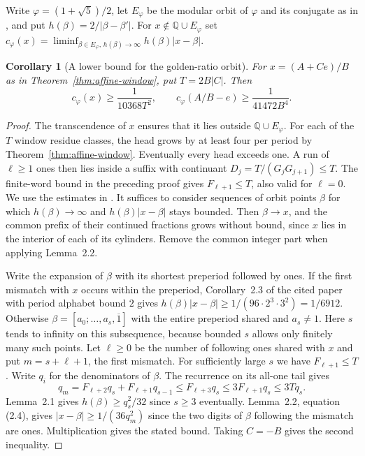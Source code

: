 \documentclass[11pt]{amsart}
\newtheorem{corollary}[theorem]{Corollary}
\theoremstyle{definition}
\theoremstyle{remark}
\numberwithin{equation}{section}
\newcommand{\Q}{\mathbb{Q}}
\begin{document}
Write $\varphi=(1+\sqrt5)/2$, let $E_\varphi$ be the modular orbit
of $\varphi$ and its conjugate as in \cite[(1.1)--(1.2)]{BugeaudQuad},
and put $h(\beta)=2/|\beta-\beta'|$. For $x\notin\Q\cup E_\varphi$
set $c_\varphi(x)=\liminf_{\beta\in E_\varphi,\,h(\beta)\to\infty}
h(\beta)|x-\beta|$.
\begin{corollary}[A lower bound for the golden-ratio orbit]\label{cor:golden-bound}
For $x=(A+Ce)/B$ as in Theorem~\ref{thm:affine-window}, put
$T=2B|C|$. Then
\[
 c_\varphi(x)\ge\frac{1}{10368T^2},
 \qquad c_\varphi(A/B-e)\ge\frac{1}{41472B^4}.
\]
\end{corollary}
\begin{proof}
The transcendence of $x$ ensures that it lies outside $\Q\cup E_\varphi$.
For each of the $T$ window residue classes, the head grows by at least
four per period by Theorem~\ref{thm:affine-window}. Eventually every
head exceeds one. A run of $\ell\ge1$ ones then lies inside a suffix
with continuant $D_j=T/(G_jG_{j+1})\le T$. The finite-word bound in
the preceding proof gives $F_{\ell+1}\le T$, also valid for $\ell=0$.
We use the estimates in \cite[Lemmas~2.1--2.2 and Corollary~2.3]{BugeaudQuad}.
It suffices to consider sequences of orbit points $\beta$ for which
$h(\beta)\to\infty$ and $h(\beta)|x-\beta|$ stays bounded. Then
$\beta\to x$, and the common prefix of their continued fractions grows
without bound, since $x$ lies in the interior of each of its cylinders.
Remove the common integer part when applying Lemma~2.2.

Write the expansion of $\beta$ with its shortest preperiod followed
by ones. If the first mismatch with $x$ occurs within the preperiod,
Corollary~2.3 of the cited paper with period alphabet bound $2$ gives
$h(\beta)|x-\beta|\ge1/(96\cdot2^3\cdot3^2)=1/6912$.
Otherwise $\beta=[a_0;\ldots,a_s,\overline{1}]$ with the entire
preperiod shared and $a_s\ne1$. Here $s$ tends to infinity on this
subsequence, because bounded $s$ allows only finitely many such
points. Let $\ell\ge0$ be the number of following ones shared with $x$
and put $m=s+\ell+1$, the first mismatch. For sufficiently large $s$
we have $F_{\ell+1}\le T$. Write $q_i$ for the denominators of $\beta$.
The recurrence on its all-one tail gives
\[
 q_m=F_{\ell+2}q_s+F_{\ell+1}q_{s-1}
     \le F_{\ell+3}q_s\le3F_{\ell+1}q_s\le3Tq_s .
\]
Lemma~2.1 gives $h(\beta)\ge q_s^2/32$ since $s\ge3$ eventually.
Lemma~2.2, equation (2.4), gives $|x-\beta|\ge 1/(36q_m^2)$
since the two digits of $\beta$ following the mismatch are ones.
Multiplication gives the stated bound. Taking $C=-B$ gives the
second inequality.
\end{proof}
\end{document}
